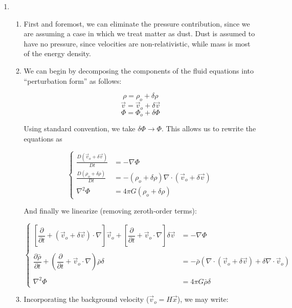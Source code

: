 \begin{enumerate}

  \item

    \begin{enumerate}

      \item First and foremost, we can eliminate the pressure contribution, since we are assuming a case in which we treat matter as dust. Dust is assumed to have no pressure, since velocities are non-relativistic, while mass is most of the energy density.

      \item We can begin by decomposing the components of the fluid equations into ``perturbation form'' as follows:

        $$\rho=\rho_o+\delta \rho$$
        $$\vec{v}=\vec{v}_o+\delta \vec{v}$$
        $$\Phi=\Phi_o+\delta \Phi$$

        Using standard convention, we take $\delta \Phi\to\Phi$. This allows us to rewrite the equations as

        $$\left\{\begin{array}{ll} \frac{D(\vec{v}_o+\delta\vec{v})}{Dt}&=-\nabla\Phi\\ \frac{D(\rho_o+\delta \rho)}{Dt} &= -(\rho_o+\delta \rho)\nabla\cdot(\vec{v}_o+\delta\vec{v})\\ \nabla^2\Phi&=4\pi G(\rho_o+\delta \rho) \end{array}$$

        And finally we linearize (removing zeroth-order terms):

        $$\boxed{\left\{\begin{array}{ll} \left[\dfrac{\partial}{\partial t}+(\vec{v}_o+\delta\vec{v})\cdot\nabla\right]\vec{v}_o+\left[ \dfrac{\partial}{\partial t}+\vec{v}_o\cdot\nabla \right]\delta\vec{v}&=-\nabla\Phi\\\\ \dfrac{\partial\bar{\rho}}{\partial t}+\left( \dfrac{\partial}{\partial t}+\vec{v}_o\cdot\nabla \right)\bar{\rho}\delta &= -\bar{\rho}(\nabla\cdot(\vec{v}_o+\delta\vec{v})+\delta\nabla\cdot\vec{v}_o)\\\\ \nabla^2\Phi&=4\pi G\bar{\rho}\delta \end{array}}$$

        \item Incorporating the background velocity ($\vec{v}_o=H\vec{x}$), we may write:


\end{enumerate}
\end{enumerate}
